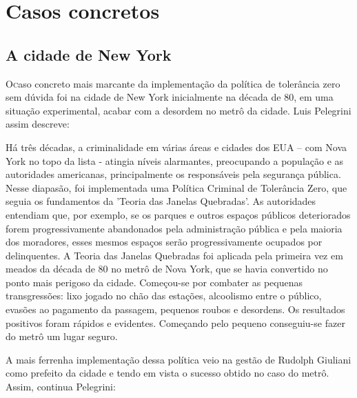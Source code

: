\documentclass[
	12pt,				%
	openright,			%
	twoside,			%
	a4paper,			%
	chapter=TITLE,		%
	section=TITLE,		%
	subsection=TITLE,	%
	subsubsection=TITLE,%
	spanish,            %
	english,			%
	brazil				%
	]{abntex2}
\begin{document}
\section{Casos concretos}
\subsection{A cidade de New York}
\lettrine[lines=2, lhang=0.33, loversize=0.25]{O} caso concreto mais marcante da implementação da política de tolerância zero
sem dúvida foi na cidade de New York inicialmente na década de 80, em uma situação
experimental, acabar com a desordem no metrô da cidade. Luis Pelegrini 
assim descreve:
\begin{citacao}
Há três décadas, a criminalidade em várias áreas e cidades dos EUA – com Nova York no topo da lista -
atingia níveis alarmantes, preocupando a população e as autoridades americanas, principalmente os
responsáveis pela segurança pública. Nesse diapasão, foi implementada uma Política Criminal de Tolerância
Zero, que seguia os fundamentos da 'Teoria das Janelas Quebradas'.
As autoridades entendiam que, por exemplo, se os parques e outros espaços públicos deteriorados forem
progressivamente abandonados pela administração pública e pela maioria dos moradores, esses mesmos
espaços serão progressivamente ocupados por delinquentes.
A Teoria das Janelas Quebradas foi aplicada pela primeira vez em meados da década de 80 no metrô de Nova
York, que se havia convertido no ponto mais perigoso da cidade. Começou-se por combater as pequenas
transgressões: lixo jogado no chão das estações, alcoolismo entre o público, evasões ao pagamento da
passagem, pequenos roubos e desordens. Os resultados positivos foram rápidos e evidentes. Começando pelo
pequeno conseguiu-se fazer do metrô um lugar seguro.\cite{Pelegrini}
\end{citacao}
\par
A mais ferrenha implementação dessa política veio na gestão de Rudolph Giuliani como prefeito
da cidade e tendo em vista o sucesso obtido no caso do metrô. Assim, continua Pelegrini: 
\end{document}
